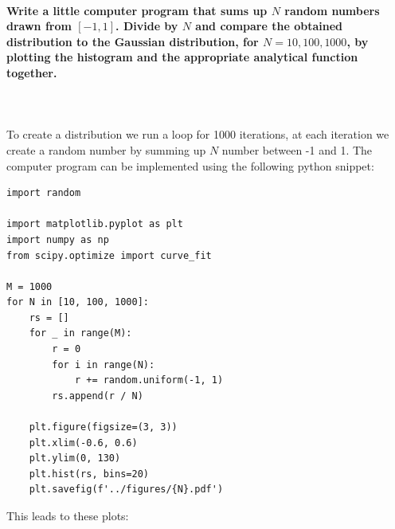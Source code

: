 \paragraph{Write a little computer program that sums up $N$ random numbers 
drawn from $[-1,1]$. Divide by $N$ and compare the obtained distribution to the 
Gaussian distribution, for $N=10,100,1000$, by plotting the histogram and the 
appropriate analytical function together.} \ \\
\\ 
To create a distribution we run a loop for 1000 iterations, at each iteration 
we create a random number by summing up $N$ number between -1 and 1.
The computer program can be implemented using the following python snippet: \\
\begin{lstlisting}
import random

import matplotlib.pyplot as plt
import numpy as np
from scipy.optimize import curve_fit

M = 1000
for N in [10, 100, 1000]:
    rs = []
    for _ in range(M):
        r = 0
        for i in range(N):
            r += random.uniform(-1, 1)
        rs.append(r / N)

    plt.figure(figsize=(3, 3))
    plt.xlim(-0.6, 0.6)
    plt.ylim(0, 130)
    plt.hist(rs, bins=20)
    plt.savefig(f'../figures/{N}.pdf')
\end{lstlisting}
This leads to these plots:
